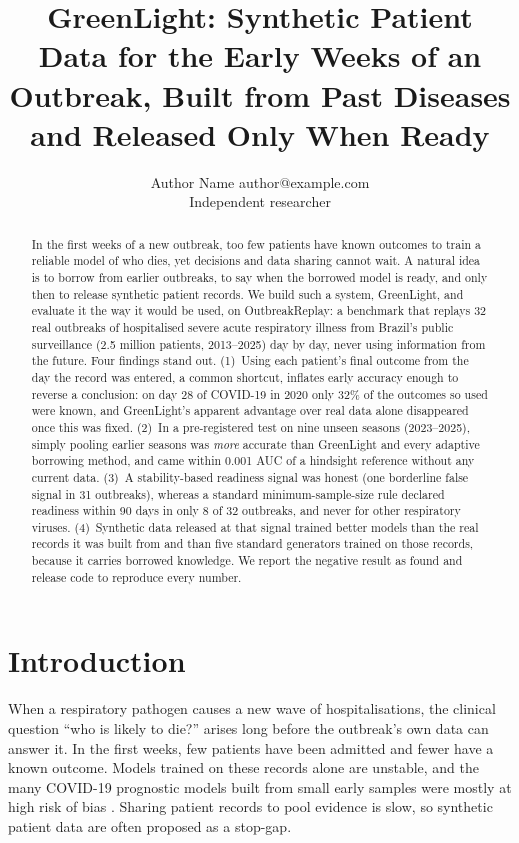 \documentclass[10pt]{article}
\title{GreenLight: Synthetic Patient Data for the Early Weeks of an Outbreak, Built from Past Diseases and Released Only When Ready}
\author{\name Author Name \email author@example.com \\
      \addr Independent researcher}
\begin{document}
\maketitle

\begin{abstract}
In the first weeks of a new outbreak, too few patients have known outcomes to train a reliable model of who dies,
yet decisions and data sharing cannot wait. A natural idea is to borrow from earlier outbreaks, to say when the
borrowed model is ready, and only then to release synthetic patient records. We build such a system, GreenLight, and evaluate it the way it would be used, on OutbreakReplay: a benchmark that
replays 32 real outbreaks of hospitalised severe acute respiratory illness from Brazil's public surveillance (2.5 million patients, 2013--2025) day by day, never using
information from the future. Four findings stand out. (1)~Using each patient's final outcome from the day the record
was entered, a common shortcut, inflates early accuracy enough to reverse a conclusion: on day 28 of COVID-19 in 2020
only 32\% of the outcomes so used were known, and GreenLight's apparent advantage over real data alone disappeared once this
was fixed. (2)~In a pre-registered test on nine unseen seasons (2023--2025), simply pooling earlier seasons was
\emph{more} accurate than GreenLight and every adaptive borrowing method, and came within 0.001 AUC of a hindsight reference
without any current data. (3)~A stability-based readiness signal was honest (one borderline false signal in 31
outbreaks), whereas a standard minimum-sample-size rule declared readiness within 90 days in only 8 of 32
outbreaks, and never for other respiratory viruses. (4)~Synthetic data released at that signal trained better models than the real records it was built
from and than five standard generators trained on those records, because it carries borrowed knowledge. We report
the negative result as found and release code to reproduce every number.
\end{abstract}

\section{Introduction}
When a respiratory pathogen causes a new wave of hospitalisations, the clinical question ``who is likely to die?''
arises long before the outbreak's own data can answer it. In the first weeks, few patients have been admitted and
fewer have a known outcome. Models trained on these records alone are unstable, and the many COVID-19 prognostic
models built from small early samples were mostly at high risk of bias \citep{wynants2020covid}. Sharing patient
records to pool evidence is slow, so synthetic patient data are often proposed as a stop-gap.
\end{document}
